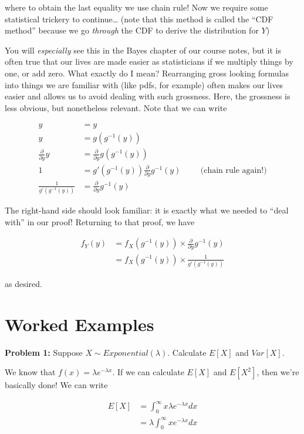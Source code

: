\documentclass[
  letterpaper,
  DIV=11,
  numbers=noendperiod]{scrreprt}
\begin{document}
where to obtain the last equality we use chain rule! Now we require some
statistical trickery to continue\ldots{} (note that this method is
called the ``CDF method'' because we go \emph{through} the CDF to derive
the distribution for \(Y\))

You will \emph{especially} see this in the Bayes chapter of our course
notes, but it is often true that our lives are made easier as
statisticians if we multiply things by one, or add zero. What exactly do
I mean? Rearranging gross looking formulas into things we are familiar
with (like pdfs, for example) often makes our lives easier and allows us
to avoid dealing with such grossness. Here, the grossness is less
obvious, but nonetheless relevant. Note that we can write

\begin{align*}
    y & = y \\
    y & = g(g^{-1}(y)) \\
    \frac{\partial}{\partial y} y & = \frac{\partial}{\partial y} g(g^{-1}(y)) \\
    1 & = g'(g^{-1}(y)) \frac{\partial}{\partial y} g^{-1}(y) \hspace{1cm} \text{(chain rule again!)} \\
    \frac{1}{g'(g^{-1}(y))} & = \frac{\partial}{\partial y} g^{-1}(y)
\end{align*}

The right-hand side should look familiar: it is exactly what we needed
to ``deal with'' in our proof! Returning to that proof, we have

\begin{align*}
    f_Y(y) & = f_X(g^{-1}(y)) \times \frac{\partial}{\partial y} g^{-1}(y) \\
    & = f_X(g^{-1}(y)) \times \frac{1}{g'(g^{-1}(y))} 
\end{align*}

as desired.

\hypertarget{worked-examples}{%
\section{Worked Examples}\label{worked-examples}}

\textbf{Problem 1:} Suppose \(X \sim Exponential(\lambda)\). Calculate
\(E[X]\) and \(Var[X]\).

We know that \(f(x) = \lambda e^{-\lambda x}\). If we can calculate
\(E[X]\) and \(E[X^2]\), then we're basically done! We can write

\begin{align*}    
E[X] & = \int_0^\infty x \lambda e^{-\lambda x} dx \\    
& = \lambda \int_0^\infty x e^{-\lambda x} dx 
\end{align*}
\end{document}
